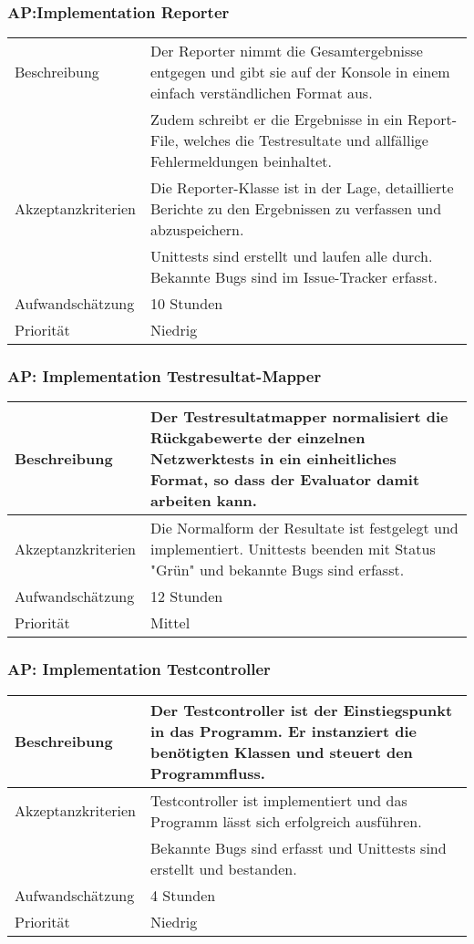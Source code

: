\documentclass[
	ngerman,
	toc=listof, %
	toc=bibliography, %
	footnotes=multiple, %
	parskip=half, %
	numbers=noendperiod %
]{scrartcl}
\begin{document}
	\subsubsection{AP:Implementation Reporter}
	\begin{tabularx}{\textwidth}{lX}
		\toprule
		Beschreibung & Der Reporter nimmt die Gesamtergebnisse entgegen und gibt sie auf der Konsole in einem einfach verständlichen Format aus. \\
		& Zudem schreibt er die Ergebnisse in ein Report-File, welches die Testresultate und allfällige Fehlermeldungen beinhaltet. \\
		\midrule
		Akzeptanzkriterien & Die Reporter-Klasse ist in der Lage, detaillierte Berichte zu den Ergebnissen zu verfassen und abzuspeichern.\\
		 & Unittests sind erstellt und laufen alle durch. Bekannte Bugs sind im Issue-Tracker erfasst.\\
		\midrule
		Aufwandschätzung & 10 Stunden\\
		\midrule
		Priorität & Niedrig \\
		\bottomrule
	\end{tabularx}

	\subsubsection{AP: Implementation Testresultat-Mapper}
	\begin{tabularx}{\textwidth}{lX}
		\toprule
		Beschreibung & Der Testresultatmapper normalisiert die Rückgabewerte der einzelnen Netzwerktests in ein einheitliches Format, so dass der Evaluator damit arbeiten kann.\\
		\midrule
		Akzeptanzkriterien & Die Normalform der Resultate ist festgelegt und implementiert. Unittests beenden mit Status "Grün" und bekannte Bugs sind erfasst.\\
		\midrule
		Aufwandschätzung & 12 Stunden\\
		\midrule
		Priorität & Mittel \\
		\bottomrule
	\end{tabularx}

	\subsubsection{AP: Implementation Testcontroller}
	\begin{tabularx}{\textwidth}{lX}
		\toprule
		Beschreibung & Der Testcontroller ist der Einstiegspunkt in das Programm. Er instanziert die benötigten Klassen und steuert den Programmfluss.\\
		\midrule
		Akzeptanzkriterien & Testcontroller ist implementiert und das Programm lässt sich erfolgreich ausführen.\\
		 & Bekannte Bugs sind erfasst und Unittests sind erstellt und bestanden.\\
		\midrule
		Aufwandschätzung & 4 Stunden \\
		\midrule
		Priorität & Niedrig \\
		\bottomrule
	\end{tabularx}
	\newpage
\end{document}
